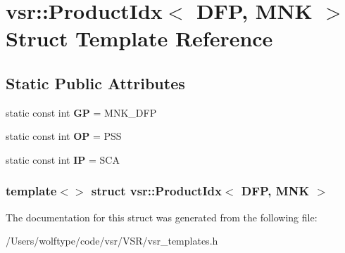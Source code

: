 \hypertarget{structvsr_1_1_product_idx_3_01_d_f_p_00_01_m_n_k_01_4}{\section{vsr\-:\-:Product\-Idx$<$ D\-F\-P, M\-N\-K $>$ Struct Template Reference}
\label{structvsr_1_1_product_idx_3_01_d_f_p_00_01_m_n_k_01_4}
}
\subsection*{Static Public Attributes}
\begin{DoxyCompactItemize}
\item 
\hypertarget{structvsr_1_1_product_idx_3_01_d_f_p_00_01_m_n_k_01_4_a1e79ddda2c9daabeb8c6d9a7bbe8d585}{static const int {\bfseries G\-P} = M\-N\-K\-\_\-\-D\-F\-P}\label{structvsr_1_1_product_idx_3_01_d_f_p_00_01_m_n_k_01_4_a1e79ddda2c9daabeb8c6d9a7bbe8d585}

\item 
\hypertarget{structvsr_1_1_product_idx_3_01_d_f_p_00_01_m_n_k_01_4_a05a0739e8d8f1e2eda052e3c83f602f8}{static const int {\bfseries O\-P} = P\-S\-S}\label{structvsr_1_1_product_idx_3_01_d_f_p_00_01_m_n_k_01_4_a05a0739e8d8f1e2eda052e3c83f602f8}

\item 
\hypertarget{structvsr_1_1_product_idx_3_01_d_f_p_00_01_m_n_k_01_4_a06cc1eb181680b27469de2f829e00dcc}{static const int {\bfseries I\-P} = S\-C\-A}\label{structvsr_1_1_product_idx_3_01_d_f_p_00_01_m_n_k_01_4_a06cc1eb181680b27469de2f829e00dcc}

\end{DoxyCompactItemize}
\subsubsection*{template$<$$>$ struct vsr\-::\-Product\-Idx$<$ D\-F\-P, M\-N\-K $>$}



The documentation for this struct was generated from the following file\-:\begin{DoxyCompactItemize}
\item 
/\-Users/wolftype/code/vsr/\-V\-S\-R/vsr\-\_\-templates.\-h\end{DoxyCompactItemize}
